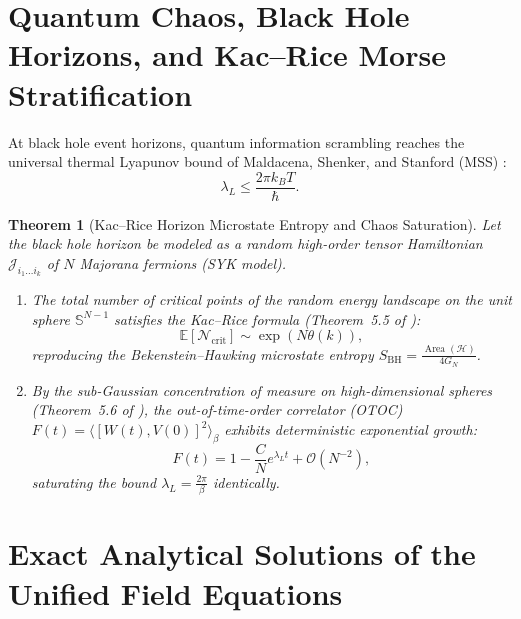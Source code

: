 \documentclass[11pt,a4paper,reqno]{amsart}
\newtheorem{theorem}{Theorem}[section]
\theoremstyle{definition}
\numberwithin{equation}{section}
\newcommand{\Sph}{\mathbb{S}}
\newcommand{\Area}{\operatorname{Area}}
\begin{document}
\section{Quantum Chaos, Black Hole Horizons, and Kac--Rice Morse Stratification}
\label{sec:chaos_kac_rice}

At black hole event horizons, quantum information scrambling reaches the universal thermal Lyapunov bound of Maldacena, Shenker, and Stanford (MSS) \cite{maldacena2016bound}:
\begin{equation}
    \label{eq:mss_lyapunov_bound}
    \lambda_L \le \frac{2\pi k_B T}{\hbar}.
\end{equation}

\begin{theorem}[Kac--Rice Horizon Microstate Entropy and Chaos Saturation]
\label{thm:horizon_morse_saturation}
Let the black hole horizon be modeled as a random high-order tensor Hamiltonian $\mathcal{J}_{i_1 \dots i_k}$ of $N$ Majorana fermions (SYK model).
\begin{enumerate}[label=(\roman*)]
    \item The total number of critical points of the random energy landscape on the unit sphere $\Sph^{N-1}$ satisfies the Kac--Rice formula (Theorem~5.5 of \cite{turing2026beyond}):
    \begin{equation}
        \mathbb{E}[\mathcal{N}_{\mathrm{crit}}] \sim \exp\left( N \theta(k) \right),
    \end{equation}
    reproducing the Bekenstein--Hawking microstate entropy $S_{\mathrm{BH}} = \frac{\Area(\mathcal{H})}{4 G_N}$.
    \item By the sub-Gaussian concentration of measure on high-dimensional spheres (Theorem~5.6 of \cite{turing2026beyond}), the out-of-time-order correlator (OTOC) $F(t) = \langle [W(t), V(0)]^2 \rangle_\beta$ exhibits deterministic exponential growth:
    \begin{equation}
        F(t) = 1 - \frac{C}{N} e^{\lambda_L t} + \mathcal{O}(N^{-2}),
    \end{equation}
    saturating the bound $\lambda_L = \frac{2\pi}{\beta}$ identically.
\end{enumerate}
\end{theorem}

\section{Exact Analytical Solutions of the Unified Field Equations}
\label{sec:analytical_solutions}
\end{document}
